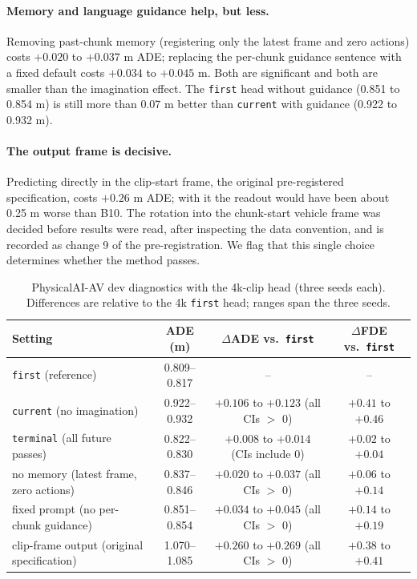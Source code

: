 \documentclass[10pt]{article}
\newcommand{\first}{\texttt{first}}
\newcommand{\current}{\texttt{current}}
\newcommand{\terminal}{\texttt{terminal}}
\begin{document}
\paragraph{Memory and language guidance help, but less.} Removing past-chunk memory (registering only the latest frame and zero actions) costs $+0.020$ to $+0.037$ m ADE; replacing the per-chunk guidance sentence with a fixed default costs $+0.034$ to $+0.045$ m. Both are significant and both are smaller than the imagination effect. The \first{} head without guidance (0.851 to 0.854 m) is still more than 0.07 m better than \current{} with guidance (0.922 to 0.932 m).

\paragraph{The output frame is decisive.} Predicting directly in the clip-start frame, the original pre-registered specification, costs $+0.26$ m ADE; with it the readout would have been about 0.25 m worse than B10. The rotation into the chunk-start vehicle frame was decided before results were read, after inspecting the data convention, and is recorded as change 9 of the pre-registration. We flag that this single choice determines whether the method passes.

\begin{table}[t]
\caption{PhysicalAI-AV dev diagnostics with the 4k-clip head (three seeds each). Differences are relative to the 4k \first{} head; ranges span the three seeds.}
\label{tab:pai-diag}
\begin{center}
\small
\begin{tabular}{lccc}
\toprule
Setting & ADE (m) & $\Delta$ADE vs.\ \first{} & $\Delta$FDE vs.\ \first{} \\
\midrule
\first{} (reference) & 0.809--0.817 & -- & -- \\
\current{} (no imagination) & 0.922--0.932 & $+0.106$ to $+0.123$ (all CIs $>$ 0) & $+0.41$ to $+0.46$ \\
\terminal{} (all future passes) & 0.822--0.830 & $+0.008$ to $+0.014$ (CIs include 0) & $+0.02$ to $+0.04$ \\
no memory (latest frame, zero actions) & 0.837--0.846 & $+0.020$ to $+0.037$ (all CIs $>$ 0) & $+0.06$ to $+0.14$ \\
fixed prompt (no per-chunk guidance) & 0.851--0.854 & $+0.034$ to $+0.045$ (all CIs $>$ 0) & $+0.14$ to $+0.19$ \\
clip-frame output (original specification) & 1.070--1.085 & $+0.260$ to $+0.269$ (all CIs $>$ 0) & $+0.38$ to $+0.41$ \\
\bottomrule
\end{tabular}
\end{center}
\end{table}
\end{document}
